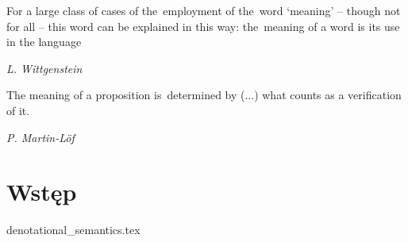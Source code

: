 \epigraph{
For a large class of cases of the~employment of the~word ‘meaning’ -- though not for all -- this word can be explained in this way: the~meaning of a word is its use in the language
}{\emph{\small{L. Wittgenstein}}}

\epigraph{The meaning of a proposition is~determined by (...) what counts as a
verification of it. \cite{Lof_96}}{\emph{\small{{P. Martin-Löf}}}}


\section{Wstęp}
{denotational_semantics.tex}

